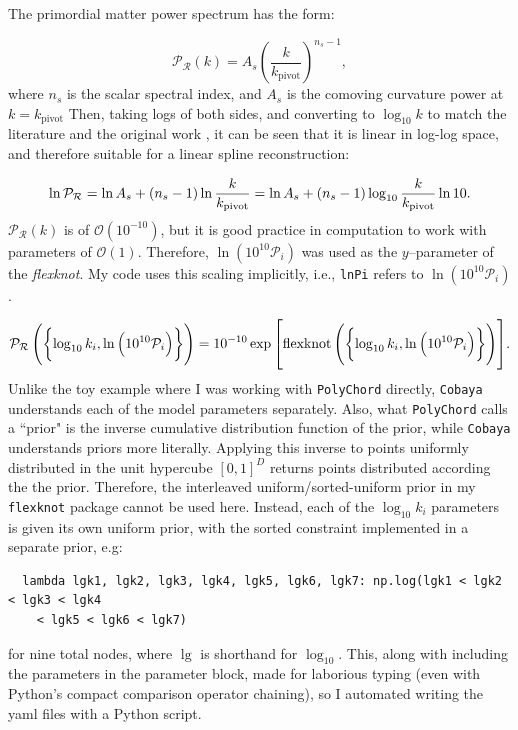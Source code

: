 \documentclass{article}
\begin{document}
The primordial matter power spectrum has the form:

\begin{equation}
  \mathcal P_\mathcal R(k) = A_s \left(\frac{k}{k_\textrm{pivot}} \right) ^ {n_s - 1},
\end{equation}
%
where $n_s$ is the scalar spectral index, and $A_s$ is the comoving curvature power at $k=k_\textrm{pivot}$ Then, taking logs of both sides, and converting to $\log_{10}{k}$ to match the literature and the original work \cite{Handley2019}, it can be seen that it is linear in log-log space, and therefore suitable for a linear spline reconstruction:

\begin{equation}
  \ln{\mathcal P_\mathcal R} = \ln{A_s} + \left(n_s - 1\right) \ln{\frac{k}{k_\textrm{pivot}}} = \ln{A_s} + \left(n_s - 1\right) \log_{10}{\frac{k}{k_\textrm{pivot}}} \ln{10}\textrm.
\end{equation}
%
$\mathcal P_\mathcal R(k)$ is of $\mathcal{O}\left(10^{-10}\right)$, but it is good practice in computation to work with parameters of $\mathcal{O}\left(1\right)$. Therefore, $\ln{\left(10^{10}\mathcal P_i\right)}$  was used as the $y$--parameter of the \textit{flexknot}. My code uses this scaling implicitly, i.e., \texttt{lnPi} refers to $\ln{\left(10^{10}\mathcal P_i\right)}$.

\begin{equation}
  \mathcal P_\mathcal R\left(\left\{\log_{10}{k_i}, \ln{\left(10^{10}\mathcal P_i\right)}\right\}\right) = 10^{-10} \exp{\left[{\textrm{flexknot}\left(\left\{\log_{10}{k_i}, \ln{\left(10^{10}\mathcal P_i\right)}\right\}\right)}\right]}\textrm.
\end{equation}
%
Unlike the toy example where I was working with \texttt{PolyChord} directly, \texttt{Cobaya} understands each of the model parameters separately. Also, what \texttt{PolyChord} calls a ``prior" is the inverse cumulative distribution function of the prior, while \texttt{Cobaya} understands priors more literally. Applying this inverse to points uniformly distributed in the unit hypercube $[0, 1]^D$ returns points distributed according the the prior. Therefore, the interleaved uniform/sorted-uniform prior in my \texttt{flexknot} package cannot be used here. Instead, each of the $\log_{10}{k_i}$ parameters is given its own uniform prior, with the sorted constraint implemented in a separate prior, e.g:
\begin{verbatim}
  lambda lgk1, lgk2, lgk3, lgk4, lgk5, lgk6, lgk7: np.log(lgk1 < lgk2 < lgk3 < lgk4 
    < lgk5 < lgk6 < lgk7)
\end{verbatim}
for nine total nodes, where $\lg$ is shorthand for $\log_{10}$. This, along with including the parameters in the parameter block, made for laborious typing (even with Python's compact comparison operator chaining), so I automated writing the yaml files with a Python script.
\end{document}
